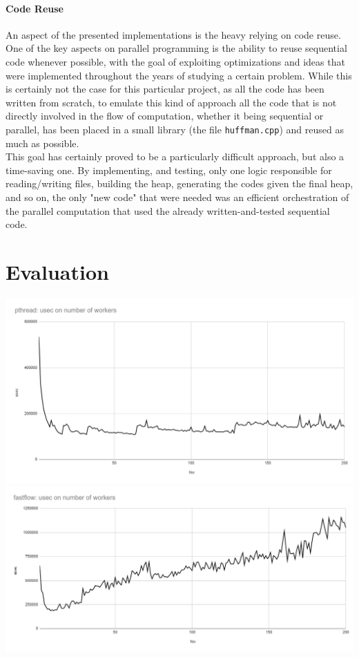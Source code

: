 \documentclass[10pt]{article}
\begin{document}
\paragraph{Code Reuse} An aspect of the presented implementations is the heavy relying on code reuse. One of the key aspects on parallel programming is the ability to reuse sequential code whenever possible, with the goal of exploiting optimizations and ideas that were implemented throughout the years of studying a certain problem. While this is certainly not the case for this particular project, as all the code has been written from scratch, to emulate this kind of approach all the code that is not directly involved in the flow of computation, whether it being sequential or parallel, has been placed in a small library (the file \texttt{huffman.cpp}) and reused as much as possible.\\
This goal has certainly proved to be a particularly difficult approach, but also a time-saving one. By implementing, and testing, only one logic responsible for reading/writing files, building the heap, generating the codes given the final heap, and so on, the only "new code" that were needed was an efficient orchestration of the parallel computation that used the already written-and-tested sequential code.
\section{Evaluation}
\begin{center}
	\includegraphics[scale=.5]{scalability_pthreads.png}\\
	\includegraphics[scale=.5]{scalability_fastflow.png}
\end{center}
\end{document}
